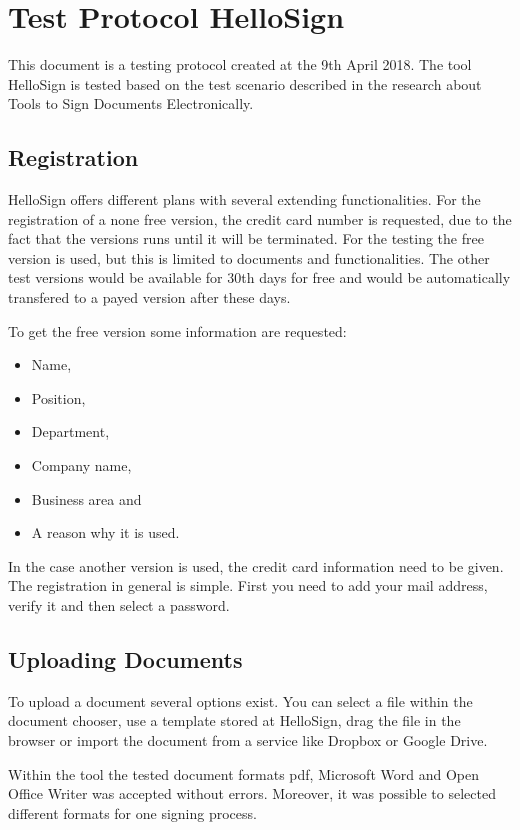 \section{Test Protocol HelloSign}
This document is a testing protocol created at the 9th April 2018. The tool HelloSign is tested based on the test scenario described in the research about Tools to Sign Documents Electronically.

\subsection{Registration}
HelloSign offers different plans with several extending functionalities. For the registration of a none free version, the credit card number is requested, due to the fact that the versions runs until it will be terminated. For the testing the free version is used, but this is limited to documents and functionalities. The other test versions would be available for 30th days for free and would be automatically transfered to a payed version after these days.

To get the free version some information are requested:
\begin{itemize}
	\item Name,
	\item Position,
	\item Department,
	\item Company name,
	\item Business area and
	\item A reason why it is used.
\end{itemize}
In the case another version is used, the credit card information need to be given. \newline
The registration in general is simple. First you need to add your mail address, verify it and then select a password.

\subsection{Uploading Documents}
To upload a document several options exist. You can select a file within the document chooser, use a template stored at HelloSign, drag the file in the browser or import the document from a service like Dropbox or Google Drive.

Within the tool the tested document formats \gls{pdf}, Microsoft Word and Open Office Writer was accepted without errors. Moreover, it was possible to selected different formats for one signing process.

